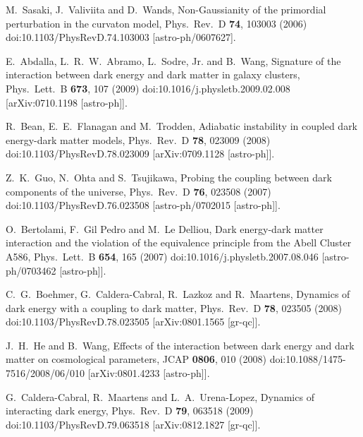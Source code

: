 \documentclass[aps,prd,nofootinbib,amsmath,amssymb,superscriptaddress,twocolumn,10pt]{revtex4}%
\begin{document}
\begin{thebibliography}{99}
  M.~Sasaki, J.~Valiviita and D.~Wands,
  Non-Gaussianity of the primordial perturbation in the curvaton model,
  Phys.\ Rev.\ D {\bf 74}, 103003 (2006)
  doi:10.1103/PhysRevD.74.103003
  [astro-ph/0607627].

  E.~Abdalla, L.~R.~W.~Abramo, L.~Sodre, Jr. and B.~Wang,
  Signature of the interaction between dark energy and dark matter in galaxy clusters,
  Phys.\ Lett.\ B {\bf 673}, 107 (2009)
  doi:10.1016/j.physletb.2009.02.008
  [arXiv:0710.1198 [astro-ph]].

  R.~Bean, E.~E.~Flanagan and M.~Trodden,
  Adiabatic instability in coupled dark energy-dark matter models,
  Phys.\ Rev.\ D {\bf 78}, 023009 (2008)
  doi:10.1103/PhysRevD.78.023009
  [arXiv:0709.1128 [astro-ph]].

  Z.~K.~Guo, N.~Ohta and S.~Tsujikawa,
  Probing the coupling between dark components of the universe,
  Phys.\ Rev.\ D {\bf 76}, 023508 (2007)
  doi:10.1103/PhysRevD.76.023508
  [astro-ph/0702015 [astro-ph]].

  O.~Bertolami, F.~Gil Pedro and M.~Le Delliou,
  Dark energy-dark matter interaction and the violation of the equivalence principle from the Abell Cluster A586,
  Phys.\ Lett.\ B {\bf 654}, 165 (2007)
  doi:10.1016/j.physletb.2007.08.046
  [astro-ph/0703462 [astro-ph]].

  C.~G.~Boehmer, G.~Caldera-Cabral, R.~Lazkoz and R.~Maartens,
  Dynamics of dark energy with a coupling to dark matter,
  Phys.\ Rev.\ D {\bf 78}, 023505 (2008)
  doi:10.1103/PhysRevD.78.023505
  [arXiv:0801.1565 [gr-qc]].

  J.~H.~He and B.~Wang,
  Effects of the interaction between dark energy and dark matter on cosmological parameters,
  JCAP {\bf 0806}, 010 (2008)
  doi:10.1088/1475-7516/2008/06/010
  [arXiv:0801.4233 [astro-ph]].

  G.~Caldera-Cabral, R.~Maartens and L.~A.~Urena-Lopez,
  Dynamics of interacting dark energy,
  Phys.\ Rev.\ D {\bf 79}, 063518 (2009)
  doi:10.1103/PhysRevD.79.063518
  [arXiv:0812.1827 [gr-qc]].


\end{thebibliography}
\end{document}
